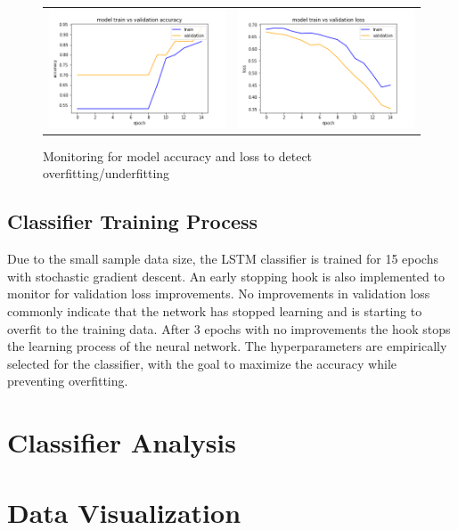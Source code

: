 \begin{figure}
   \centering
\begin{tabular}{cc}
\includegraphics[width=7.5cm]{images/classifier/model-train-vs-validation-accuracy}&
\includegraphics[width=7.5cm]{images/classifier/model-train-vs-validation-loss}\\
\end{tabular}
    \caption{Monitoring for model accuracy and loss to detect overfitting/underfitting}
    \label{model-validation-monitoring}
\end{figure}

\subsection{Classifier Training Process}

Due to the small sample data size, the LSTM classifier is trained for 15 epochs with stochastic gradient descent. An early stopping hook is also implemented to monitor for validation loss improvements. No improvements in validation loss commonly indicate that the network has stopped learning and is starting to overfit to the training data. After 3 epochs with no improvements the hook stops the learning process of the neural network. The hyperparameters are empirically selected for the classifier, with the goal to maximize the accuracy while preventing overfitting.

\section{Classifier Analysis}

\section{Data Visualization}
